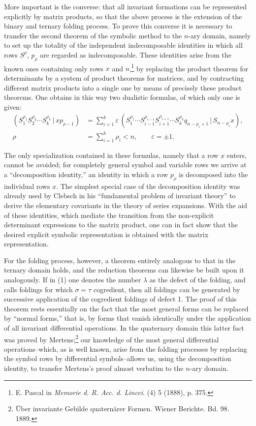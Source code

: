 \documentclass[11pt]{article}
\providecommand{\pair}[2]{(#1\,|\,#2)}
\providecommand{\eps}{\varepsilon}
\begin{document}
More important is the converse: that all invariant formations can be represented explicitly by matrix products, so that the above process is the extension of the binary and ternary folding process. To prove this converse it is necessary to transfer the second theorem of the symbolic method to the $n$-ary domain, namely to set up the totality of the independent indecomposable identities in which all rows $S^\rho$, $p_\rho$ are regarded as indecomposable. These identities arise from the known ones containing only rows $x$ and $u$,\footnote{E. Pascal in \emph{Memorie d. R. Acc. d. Lincei}. (4) 5 (1888), p. 375.} by replacing the product theorem for determinants by a system of product theorems for matrices, and by contracting different matrix products into a single one by means of precisely these product theorems. One obtains in this way two dualistic formulas, of which only one is given:
\begin{equation}
\begin{aligned}
 \pair{S_1^{\rho_1}S_2^{\rho_2}\cdots S_k^{\rho_k}}{x p_{\rho-1}}
 &=\sum_{i=1}^{k}\eps\,\pair{S_1^{\rho_1}\cdots S_{i-1}^{\rho_{i-1}}S_{i+1}^{\rho_{i+1}}\cdots S_k^{\rho_k}q_{n-\rho_i+1}}{S_{n-\rho_i}x},\\
 \rho&=\sum_{i=1}^{k}\rho_i<n,\qquad \eps=\pm1.
\end{aligned}
\tag{2}
\end{equation}

The only specialization contained in these formulas, namely that a row $x$ enters, cannot be avoided; for completely general symbol and variable rows we arrive at a ``decomposition identity,'' an identity in which a row $p_\rho$ is decomposed into the individual rows $x$. The simplest special case of the decomposition identity was already used by Clebsch in his ``fundamental problem of invariant theory'' to derive the elementary covariants in the theory of series expansions. With the aid of these identities, which mediate the transition from the non-explicit determinant expressions to the matrix product, one can in fact show that the desired explicit symbolic representation is obtained with the matrix representation.

For the folding process, however, a theorem entirely analogous to that in the ternary domain holds, and the reduction theorems can likewise be built upon it analogously. If in (1) one denotes the number $\lambda$ as the defect of the folding, and calls foldings for which $\sigma=\tau$ cogredient, then all foldings can be generated by successive application of the cogredient foldings of defect 1. The proof of this theorem rests essentially on the fact that the most general forms can be replaced by ``normal forms,'' that is, by forms that vanish identically under the application of all invariant differential operations. In the quaternary domain this latter fact was proved by Mertens;\footnote{Über invariante Gebilde quaternärer Formen. Wiener Berichte. Bd. 98. 1889.} our knowledge of the most general differential operations--which, as is well known, arise from the folding processes by replacing the symbol rows by differential symbols--allows us, using the decomposition identity, to transfer Mertens's proof almost verbatim to the $n$-ary domain.
\end{document}
